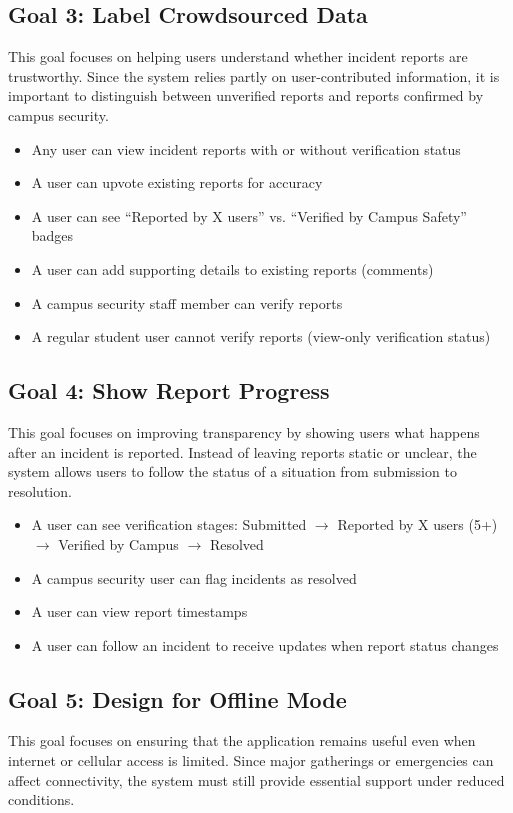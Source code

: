 \documentclass[sigconf]{acmart}
\begin{document}
\subsection{Goal 3: Label Crowdsourced Data}
This goal focuses on helping users understand whether incident reports are trustworthy. Since the system relies partly on user-contributed information, it is important to distinguish between unverified reports and reports confirmed by campus security.
 
\begin{itemize}[leftmargin=*, labelindent=0pt, itemsep=2pt]
    \item Any user can view incident reports with or without verification status
    \item A user can upvote existing reports for accuracy
    \item A user can see ``Reported by X users'' vs. ``Verified by Campus Safety'' badges
    \item A user can add supporting details to existing reports (comments)
    \item A campus security staff member can verify reports
    \item A regular student user cannot verify reports (view-only verification status)
\end{itemize}
 
\subsection{Goal 4: Show Report Progress}
This goal focuses on improving transparency by showing users what happens after an incident is reported. Instead of leaving reports static or unclear, the system allows users to follow the status of a situation from submission to resolution.
 
\begin{itemize}[leftmargin=*, labelindent=0pt, itemsep=2pt]
    \item A user can see verification stages: Submitted $\rightarrow$ Reported by X users (5+) $\rightarrow$ Verified by Campus $\rightarrow$ Resolved
    \item A campus security user can flag incidents as resolved
    \item A user can view report timestamps
    \item A user can follow an incident to receive updates when report status changes
\end{itemize}

\subsection{Goal 5: Design for Offline Mode}
This goal focuses on ensuring that the application remains useful even when internet or cellular access is limited. Since major gatherings or emergencies can affect connectivity, the system must still provide essential support under reduced conditions.
 
\end{document}
